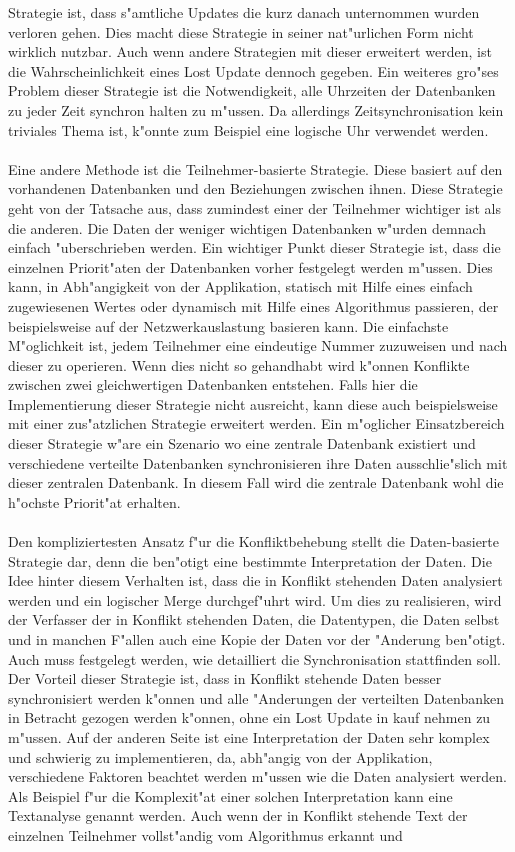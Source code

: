 \documentclass[a4paper,14pt]{scrreprt}
\begin{document}
Strategie ist, dass s"amtliche Updates die kurz danach unternommen wurden verloren gehen. Dies macht diese Strategie in seiner nat"urlichen Form nicht wirklich nutzbar. Auch wenn andere Strategien mit dieser erweitert werden, ist die Wahrscheinlichkeit eines Lost Update dennoch gegeben. Ein weiteres gro"ses Problem dieser Strategie ist die Notwendigkeit, alle Uhrzeiten der Datenbanken zu jeder Zeit synchron halten zu m"ussen. Da allerdings Zeitsynchronisation kein triviales Thema ist, k"onnte zum Beispiel eine logische Uhr verwendet werden.\\\\Eine andere Methode ist die Teilnehmer-basierte Strategie. Diese basiert auf den vorhandenen Datenbanken und den Beziehungen zwischen ihnen. Diese Strategie geht von der Tatsache aus, dass zumindest einer der Teilnehmer wichtiger ist als die anderen. Die Daten der weniger wichtigen Datenbanken w"urden demnach einfach "uberschrieben werden. Ein wichtiger Punkt dieser Strategie ist, dass die einzelnen Priorit"aten der Datenbanken vorher festgelegt werden m"ussen. Dies kann, in Abh"angigkeit von der Applikation, statisch mit Hilfe eines einfach zugewiesenen Wertes oder dynamisch mit Hilfe eines Algorithmus passieren, der beispielsweise auf der Netzwerkauslastung basieren kann. Die einfachste M"oglichkeit ist, jedem Teilnehmer eine eindeutige Nummer zuzuweisen und nach dieser zu operieren. Wenn dies nicht so gehandhabt wird k"onnen Konflikte zwischen zwei gleichwertigen Datenbanken entstehen. Falls hier die Implementierung dieser Strategie nicht ausreicht, kann diese auch beispielsweise mit einer zus"atzlichen Strategie erweitert werden. Ein m"oglicher Einsatzbereich dieser Strategie w"are ein Szenario wo eine zentrale Datenbank existiert und verschiedene verteilte Datenbanken synchronisieren ihre Daten ausschlie"slich mit dieser zentralen Datenbank. In diesem Fall wird die zentrale Datenbank wohl die h"ochste Priorit"at erhalten.\\\\Den kompliziertesten Ansatz f"ur die Konfliktbehebung stellt die Daten-basierte Strategie dar, denn die ben"otigt eine bestimmte Interpretation der Daten. Die Idee hinter diesem Verhalten ist, dass die in Konflikt stehenden Daten analysiert werden und ein logischer Merge durchgef"uhrt wird. Um dies zu realisieren, wird der Verfasser der in Konflikt stehenden Daten, die Datentypen, die Daten selbst und in manchen F"allen auch eine Kopie der Daten vor der "Anderung ben"otigt. Auch muss festgelegt werden, wie detailliert die Synchronisation stattfinden soll. Der Vorteil dieser Strategie ist, dass in Konflikt stehende Daten besser synchronisiert werden k"onnen und alle "Anderungen der verteilten Datenbanken in Betracht gezogen werden k"onnen, ohne ein Lost Update in kauf nehmen zu m"ussen. Auf der anderen Seite ist eine Interpretation der Daten sehr komplex und schwierig zu implementieren, da, abh"angig von der Applikation, verschiedene Faktoren beachtet werden m"ussen wie die Daten analysiert werden. Als Beispiel f"ur die Komplexit"at einer solchen Interpretation kann eine Textanalyse genannt werden. Auch wenn der in Konflikt stehende Text der einzelnen Teilnehmer vollst"andig vom Algorithmus erkannt und 
\end{document}
